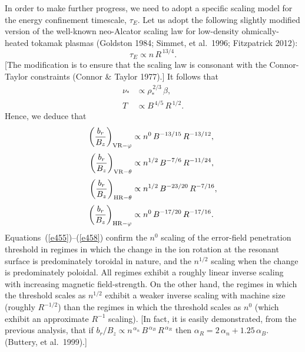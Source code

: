 \documentclass[notitlepage,12pt]{article}
\begin{document}
In order to make further progress, we need to adopt a specific scaling model for the energy confinement timescale, $\tau_E$. Let us adopt
the following slightly modified version of the well-known neo-Alcator scaling law for low-density ohmically-heated tokamak plasmas (Goldston 1984; Simmet, et al.\ 1996; Fitzpatrick 2012): 
\begin{equation}
\tau_E\propto n\,R^{\,13/4}.
\end{equation}
[The modification is to ensure that the scaling law is consonant with the Connor-Taylor constraints (Connor \& Taylor 1977).]
It follows that
\begin{align}
\nu_\ast&\propto \rho_\ast^{\,2/3}\,\beta,\\[0.5ex]
T&\propto B^{\,4/5}\,R^{\,1/2}.
\end{align}
Hence, we deduce that 
\begin{align}\label{e455}
\left(\frac{b_{r}}{B_z}\right)_{{\rm VR}-\varphi} &\propto n^{0}\,B^{-13/15}\,R^{-13/12},\\[0.5ex]
\left(\frac{b_{r}}{B_z}\right)_{{\rm VR}-\theta} &\propto n^{1/2}\,B^{-7/6}\,R^{-11/24},\\[0.5ex]
\left(\frac{b_{r}}{B_z}\right)_{{\rm HR}-\theta} &\propto n^{1/2}\,B^{-23/20}\,R^{-7/16},\\[0.5ex]
\left(\frac{b_{r}}{B_z}\right)_{{\rm HR}-\varphi} &\propto n^{0}\,B^{-17/20}\,R^{-17/16}.\label{e458}
\end{align}
Equations~(\ref{e455})--(\ref{e458}) confirm the $n^{0}$ scaling of the error-field penetration threshold in regimes in which the change in the ion rotation at the resonant surface is predominately toroidal
in nature, and the $n^{1/2}$ scaling when the change is predominately poloidal. All regimes exhibit a roughly linear inverse scaling with increasing magnetic field-strength. On the other hand, the regimes in which the threshold scales as $n^{1/2}$ exhibit a
weaker inverse scaling with machine size (roughly $R^{-1/2}$) than the regimes in which the threshold scales as $n^0$ (which
exhibit an approximate $R^{-1}$ scaling). [In fact, it is easily demonstrated, from the previous analysis, that if 
$b_r/B_z\propto n^{\,\alpha_n}\,B^{\,\alpha_B}\,R^{\,\alpha_R}$ then $\alpha_R = 2\,\alpha_n+1.25\,\alpha_B$. (Buttery, et al.\ 1999).]
\end{document}
